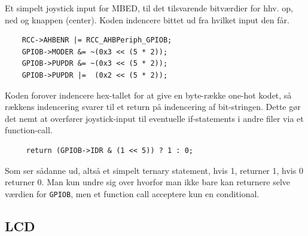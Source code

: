 Et simpelt joystick input for MBED, til det tilsvarende bitværdier for hhv. op, ned og knappen (center). Koden indencere bittet ud fra hvilket input den får.

\vspace{1em}
\begin{lstlisting}
    RCC->AHBENR |= RCC_AHBPeriph_GPIOB;
    GPIOB->MODER &= ~(0x3 << (5 * 2));   
    GPIOB->PUPDR &= ~(0x3 << (5 * 2));
    GPIOB->PUPDR |=  (0x2 << (5 * 2)); 
\end{lstlisting}
\vspace{-2em}

Koden forover indencere hex-tallet for at give en byte-række one-hot kodet, så rækkens indencering svarer til et return på indencering af bit-stringen. Dette gør det nemt at overfører joystick-input til eventuelle if-statements i andre filer via et function-call.

\vspace{1em}
\begin{lstlisting}
     return (GPIOB->IDR & (1 << 5)) ? 1 : 0;
\end{lstlisting}
\vspace{-2em}

Som ser sådanne ud, altså et simpelt ternary statement, hvis 1, returner 1, hvis 0 returner 0. Man kun undre sig over hvorfor man ikke bare kan returnere selve værdien for \lstinline!GPIOB!, men et function call acceptere kun en conditional.

\vspace{3em}

\vspace{3pt}
\subsection{LCD}
\vspace{3pt}

